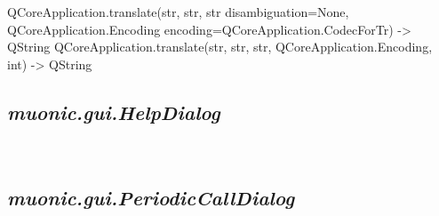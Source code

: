 \documentclass[letterpaper,10pt,english]{sphinxmanual}
\begin{document}

\begin{fulllineitems}
\label{muonic:muonic.gui.ThresholdDialog.tr}
QCoreApplication.translate(str, str, str disambiguation=None, QCoreApplication.Encoding encoding=QCoreApplication.CodecForTr) -\textgreater{} QString
QCoreApplication.translate(str, str, str, QCoreApplication.Encoding, int) -\textgreater{} QString

\end{fulllineitems}



\subsection{\emph{muonic.gui.HelpDialog}}
\label{muonic:muonic-gui-helpdialog}\label{muonic:module-muonic.gui.HelpDialog}

\begin{fulllineitems}
\label{muonic:muonic.gui.HelpDialog.HelpDialog}~

\begin{fulllineitems}
\label{muonic:muonic.gui.HelpDialog.HelpDialog.helptext}
\end{fulllineitems}


\end{fulllineitems}



\subsection{\emph{muonic.gui.PeriodicCallDialog}}
\label{muonic:module-muonic.gui.PeriodicCallDialog}\label{muonic:muonic-gui-periodiccalldialog}

\begin{fulllineitems}
\label{muonic:muonic.gui.PeriodicCallDialog.PeriodicCallDialog}
\end{fulllineitems}
\end{document}
